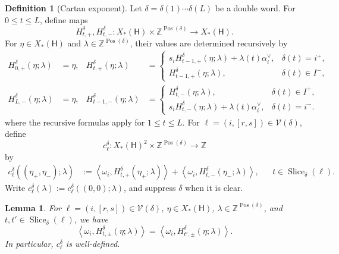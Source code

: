 \documentclass[10pt,a4paper]{article}
\newtheorem{lemma}[theorem]{Lemma}
\theoremstyle{definition}
\newtheorem{definition}[theorem]{Definition}
\theoremstyle{remark}
\newcommand{\torusH}{\mathsf{H}}
\newcommand{\Vcal}{\mathcal V}
\begin{document}
\begin{definition}[Cartan exponent]
\label{def:cartan-exponent}
Let \(\delta=\delta(1)\cdots\delta(L)\) be a double word.  For
\(0\le t\le L\), define maps
\[
 H_{t,+}^{\delta},H_{t,-}^{\delta}:
 X_*(\torusH)\times\mathbb Z^{\operatorname{Pos}(\delta)}
 \longrightarrow X_*(\torusH).
\]
For \(\eta\in X_*(\torusH)\) and
\(\lambda\in\mathbb Z^{\operatorname{Pos}(\delta)}\), their values are
determined recursively by
\begin{equation}
\begin{aligned}
 H_{0,+}^{\delta}(\eta;\lambda)&=\eta,&
 H_{t,+}^{\delta}(\eta;\lambda)&=
 \begin{cases}
  s_iH_{t-1,+}^{\delta}(\eta;\lambda)+\lambda(t)\alpha_i^\vee,
    &\delta(t)=i^+,\\
  H_{t-1,+}^{\delta}(\eta;\lambda),&\delta(t)\in I^-,
 \end{cases}\\
 H_{L,-}^{\delta}(\eta;\lambda)&=\eta,&
 H_{t-1,-}^{\delta}(\eta;\lambda)&=
 \begin{cases}
  H_{t,-}^{\delta}(\eta;\lambda),&\delta(t)\in I^+,\\
  s_iH_{t,-}^{\delta}(\eta;\lambda)+\lambda(t)\alpha_i^\vee,
    &\delta(t)=i^-.
 \end{cases}
\end{aligned}
\label{eq:cartan-exponent-recursion}
\end{equation}
where the recursive formulas apply for \(1\le t\le L\).  For
\(\ell=(i,[r,s])\in\Vcal(\delta)\), define
\[
 c_\ell^\delta:X_*(\torusH)^2
 \times\mathbb Z^{\operatorname{Pos}(\delta)}\longrightarrow\mathbb Z
\]
by
\begin{equation}
 \begin{aligned}
 c_\ell^{\delta}((\eta_+,\eta_-);\lambda)
 &:={}
 \left\langle\omega_i,H_{t,+}^\delta(\eta_+;\lambda)\right\rangle
 +\left\langle\omega_i,H_{t,-}^\delta(\eta_-;\lambda)\right\rangle,
 &&t\in\operatorname{Slice}_\delta(\ell).
 \end{aligned}
 \label{eq:cartan-exponent}
\end{equation}
Write \(c_\ell^\delta(\lambda):=c_\ell^\delta((0,0);\lambda)\), and suppress
\(\delta\) when it is clear.
\end{definition}

\begin{lemma}
\label{lem:cartan-exponent-choice-independence}
For \(\ell=(i,[r,s])\in\Vcal(\delta)\),
\(\eta\in X_*(\torusH)\),
\(\lambda\in\mathbb Z^{\operatorname{Pos}(\delta)}\), and
\(t,t'\in\operatorname{Slice}_\delta(\ell)\), we have
\[
 \left\langle\omega_i,H_{t,\pm}^\delta(\eta;\lambda)\right\rangle
 =\left\langle\omega_i,H_{t',\pm}^\delta(\eta;\lambda)\right\rangle.
\]
In particular, \(c_\ell^\delta\) is well-defined.
\end{lemma}
\end{document}
